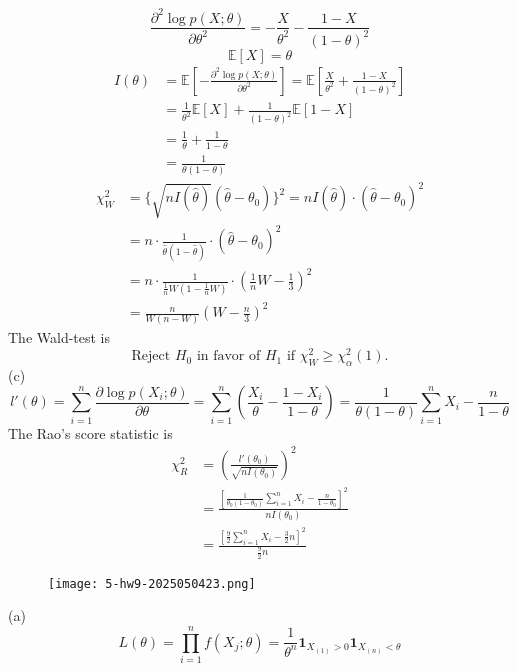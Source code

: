 \[
\frac{ \partial^2 \log p(X;\theta) }{ \partial \theta ^2 }=-\frac{X}{\theta^{2}}-\frac{1-X}{(1-\theta)^2}
\]
\[
\mathbb{E}[X]=\theta
\]
\[
\begin{aligned}
I(\theta) & =\mathbb{E}\left[ -\frac{ \partial^2 \log p(X;\theta) }{ \partial \theta ^2 }  \right]=\mathbb{E}\left[ \frac{X}{\theta^{2}}+\frac{1-X}{(1-\theta )^2} \right] \\
 & =\frac{1}{\theta^{2}}\mathbb{E}[X]+\frac{1}{(1-\theta)^2}\mathbb{E}[1-X] \\
 & =\frac{1}{\theta}+\frac{1}{1-\theta} \\
 & =\frac{1}{\theta(1-\theta)}
\end{aligned}
\]
\[
\begin{aligned}
\chi^{2}_{W} & =\{ \sqrt{ nI(\widehat{\theta}) }(\widehat{\theta}-\theta_0) \}^{2}=nI(\widehat{\theta})\cdot(\widehat{\theta}-\theta_0)^2  \\
 & =n\cdot\frac{1}{\widehat{\theta}(1-\widehat{\theta})}\cdot(\widehat{\theta}-\theta_0)^2 \\
 & =n\cdot\frac{1}{\frac{1}{n}W\left( 1-\frac{1}{n}W \right)}\cdot\left( \frac{1}{n}W-\frac{1}{3} \right)^2 \\
 & =\frac{n}{W(n-W)}\left( W-\frac{n}{3} \right)^2
\end{aligned}
\]
The Wald-test is
\[
\text { Reject } H_0 \text { in favor of } H_1 \text { if } \chi_W^2 \geq \chi_\alpha^2(1) \text {. }
\]
(c)
\[
l'(\theta)=\sum_{i=1}^{n} \frac{ \partial \log p(X_i;\theta) }{ \partial \theta } =\sum_{i=1}^{n} \left( \frac{X_i}{\theta}-\frac{1-X_i}{1-\theta} \right)=\frac{1}{\theta(1-\theta)}\sum_{i=1}^{n} X_i-\frac{n}{1-\theta}
\]
The Rao's score statistic is
\[
\begin{aligned}
\chi^{2}_{R} & =\left( \frac{l'(\theta_0)}{\sqrt{ nI(\theta_0) }} \right)^2 \\
 & =\frac{\left[ \frac{1}{\theta_0 (1-\theta_0)}\sum_{i=1}^{n} X_i-\frac{n}{1-\theta_0} \right]^2}{nI(\theta_0)} \\
 & =\frac{\left[\frac{9}{2}\sum_{i=1}^{n} X_i-\frac{3}{2}n \right]^2}{\frac{9}{2}n}
\end{aligned}
\]
\begin{exercise}
\begin{figure}[H]
\centering
\texttt{[image: 5-hw9-2025050423.png]}
\label{}
\end{figure}
\end{exercise}
(a)
\[
L(\theta)=\prod_{i=1}^{n} f(X_j;\theta)=\frac{1}{\theta^{n}}\mathbf{1}_{X_{(1)}>0}\mathbf{1}_{X_{(n)}<\theta}
\]
